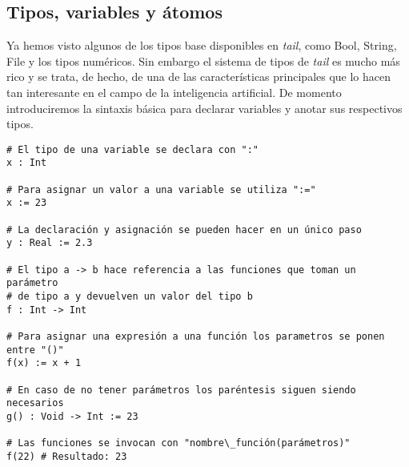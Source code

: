 \subsection{Tipos, variables y átomos}

Ya hemos visto algunos de los tipos base disponibles en \textit{tail}, como Bool, String, File y los tipos numéricos. Sin embargo el sistema de tipos de \textit{tail} es mucho más rico y se trata, de hecho, de una de las características principales que lo hacen tan interesante en el campo de la inteligencia artificial. De momento introduciremos la sintaxis básica para declarar variables y anotar sus respectivos tipos.

\begin{lstlisting}[style=tail, caption={Variables y funciones}]
# El tipo de una variable se declara con ":"
x : Int

# Para asignar un valor a una variable se utiliza ":="
x := 23

# La declaración y asignación se pueden hacer en un único paso
y : Real := 2.3

# El tipo a -> b hace referencia a las funciones que toman un parámetro
# de tipo a y devuelven un valor del tipo b
f : Int -> Int

# Para asignar una expresión a una función los parametros se ponen entre "()"
f(x) := x + 1

# En caso de no tener parámetros los paréntesis siguen siendo necesarios
g() : Void -> Int := 23

# Las funciones se invocan con "nombre\_función(parámetros)"
f(22) # Resultado: 23
\end{lstlisting}



